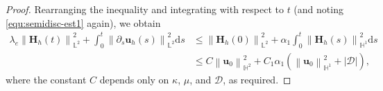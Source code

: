 \documentclass[11pt, reqno]{amsart}
\theoremstyle{definition}
\newtheorem{proposition}[theorem]{Proposition}
\theoremstyle{remark}
\numberwithin{equation}{section}
\newcommand{\bff}{\boldsymbol}
\newcommand{\bb}{\mathbb}
\newcommand{\ddt}{\frac{\mathrm{d}}{\mathrm{d}t}}
\newcommand{\ds}{\mathrm{d}s}
\newcommand{\norm}[2]{\left\|{#1}\right\|_{#2}}
\newcommand{\inpro}[2]{\left\langle#1,#2\right\rangle}
\begin{document}
\begin{proof}
Rearranging the inequality and integrating with respect to $t$ (and noting \eqref{equ:semidisc-est1} again), we obtain
\begin{align*}
	\lambda_e \norm{\bff{H}_h(t)}{\bb{L}^2}^2
	+
	\int_0^t \norm{\partial_s \bff{u}_h(s)}{\bb{L}^2}^2 \ds
	&\leq
	\norm{\bff{H}_h(0)}{\bb{L}^2}^2
	+
	\alpha_1 \int_0^t \norm{\bff{H}_h(s)}{\bb{H}^1}^2 \ds
	\\
	&\leq
	C\norm{\bff{u}_0}{\bb{H}^2}^2
	+
	C_1 \alpha_1 \left( \norm{\bff{u}_0}{\bb{H}^1}^2 + |\mathscr{D}| \right),
\end{align*}
where the constant $C$ depends only on $\kappa$, $\mu$, and $\mathscr{D}$, as required.
\end{proof}

%
\end{document}
